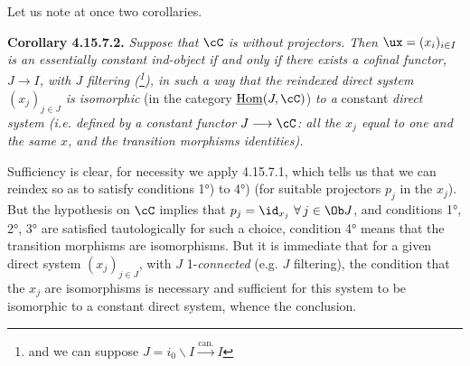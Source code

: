 Let us note at once two corollaries.

\textbf{Corollary 4.15.7.2.} \textit{Suppose that $\cC$ is without projectors. Then $\ux = (x_i)_{i\in I}$ is an essentially constant ind-object if and only if there exists a cofinal functor, $J \longrightarrow I$, with $J$ filtering (\footnote{and we can suppose $J = i_0\backslash I \xrightarrow{\text{can.}} I$}), in such a way that the reindexed direct system $(x_j)_{j\in J}$ is isomorphic} (in the category $\underline{\mathrm{Hom}}(J,\cC)$) \textit{to a} constant \textit{direct system (i.e. defined by a constant functor $J \longrightarrow \cC$: all the $x_j$ equal to one and the same $x$, and the transition morphisms identities).}

Sufficiency is clear, for necessity we apply 4.15.7.1, which tells us that we can reindex so as to satisfy conditions 1°) to 4°) (for suitable projectors $p_j$ in the $x_j$). But the hypothesis on $\cC$ implies that $p_j = \id_{x_j}\ \forall\, j \in \Ob J$, and conditions 1°, 2°, 3° are satisfied tautologically for such a choice, condition 4° means that the transition morphisms are isomorphisms. But it is immediate that for a given direct system $(x_j)_{j\in J}$, with $J$ 1-\textit{connected} (e.g. $J$ filtering), the condition that the $x_j$ are isomorphisms %
is necessary and sufficient for this system to be isomorphic to a constant direct system, whence the conclusion.

